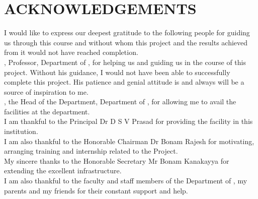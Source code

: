 \clearpage
{}
{}
\chapter*{ACKNOWLEDGEMENTS}

\noindent
\fontsize{12pt}{18pt}\selectfont I would like to express our deepest gratitude to the following people for guiding us through this course and without whom this project and the results achieved from it would not have reached completion.\\

\noindent
\textbf{\thesisguide}, Professor, Department of \thesisdept, for helping us and guiding us in the course of this project. Without his guidance, I would not have been able to successfully complete this project. His patience and genial attitude is and always will be a source of inspiration to me.\\

\noindent
\textbf{\depthod}, the Head of the Department, Department of \thesisdept, for allowing me to avail the facilities at the department.\\

\noindent
I am thankful to the Principal Dr D S V Prasad for providing the facility in this institution.\\

\noindent
I am also thankful to the Honorable Chairman Dr Bonam Rajesh for motivating, arranging training and internship related to the Project.\\

\noindent
My sincere thanks to the Honorable Secretary Mr Bonam Kanakayya for extending the excellent infrastructure.\\

\noindent
I am also thankful to the faculty and staff members of the Department of \thesisdept, my parents and my friends for their constant support and help.